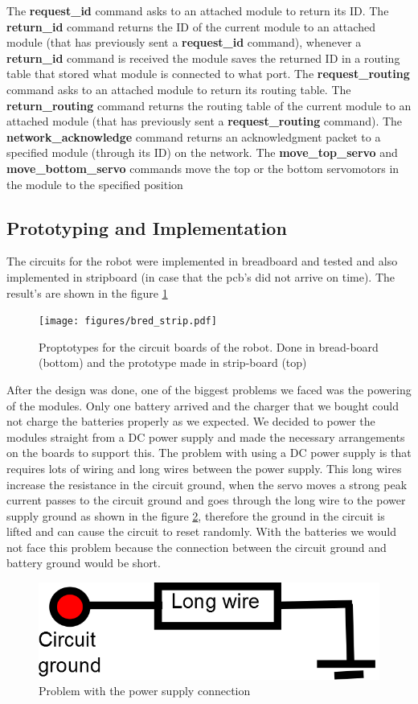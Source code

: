 The {\bf request\_id} command asks to an attached module to return its ID. The  {\bf return\_id} command returns the ID of the current module to an attached module (that has previously sent a  {\bf request\_id} command), whenever a {\bf return\_id} command is received the module saves the returned ID in a routing table that stored what module is connected to what port. The {\bf request\_routing} command asks to an attached module to return its routing table. The {\bf return\_routing} command returns the routing table of the current module to an attached module (that has previously sent a {\bf request\_routing} command). The {\bf network\_acknowledge} command returns an acknowledgment packet to a specified module (through its ID) on the network. The {\bf move\_top\_servo} and {\bf move\_bottom\_servo} commands move the top or the bottom servomotors in the module to the specified position 



\subsection{Prototyping and Implementation}

The circuits for the robot were implemented in breadboard and tested and also implemented in stripboard (in case that the pcb's did not arrive on time). The result's are shown in the figure \ref{fig:prototype}

\begin{figure}[htb]
\centering
\texttt{[image: figures/bred\_strip.pdf]}
\caption{Proptotypes for the circuit boards of the robot. Done in bread-board (bottom) and the prototype made in strip-board (top)}
\label{fig:prototype}
\end{figure}

After the design was done, one of the biggest problems we faced was the powering of the modules. Only one battery arrived and the charger that we bought could not charge the batteries properly as we expected. We decided to power the modules straight from a DC power supply and made the necessary arrangements on the boards to support this. The problem with using a DC power supply is that requires lots of wiring and long wires between the power supply. This long wires increase the resistance in the circuit ground, when the servo moves a strong peak current passes to the circuit ground and goes through the long wire to the power supply ground as shown in the figure \ref{fig:supply_problem}, therefore the ground in the circuit is lifted and can cause the circuit to reset randomly. With the batteries we would not face this problem because the connection between the circuit ground and battery ground would be short.

\begin{figure}[htb]
\centering
\includegraphics[scale = 0.2]{figures/longwire.png}
\caption{Problem with the power supply connection}
\label{fig:supply_problem}
\end{figure}


